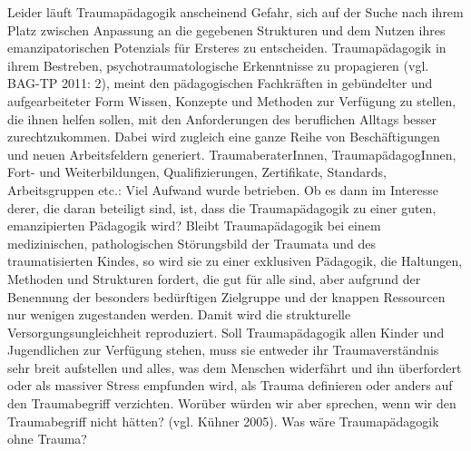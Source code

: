 Leider läuft Traumap{\"a}dagogik anscheinend Gefahr, sich auf der Suche nach ihrem Platz zwischen Anpassung an die gegebenen Strukturen und dem Nutzen ihres emanzipatorischen Potenzials für Ersteres zu entscheiden. Traumapädagogik in ihrem Bestreben, psychotraumatologische Erkenntnisse zu propagieren (vgl. BAG-TP 2011: 2), meint den pädagogischen Fachkräften in gebündelter und aufgearbeiteter Form Wissen, Konzepte und Methoden zur Verfügung zu stellen, die ihnen helfen sollen, mit den Anforderungen des beruflichen Alltags besser zurechtzukommen. Dabei wird zugleich eine ganze Reihe von Beschäftigungen und neuen Arbeitsfeldern generiert. TraumaberaterInnen, TraumapädagogInnen, Fort- und Weiterbildungen, Qualifizierungen, Zertifikate, Standards, Arbeitsgruppen etc.: Viel Aufwand wurde betrieben. Ob es dann im Interesse derer, die daran beteiligt sind, ist, dass die Traumap{\"a}dagogik zu einer guten, emanzipierten Pädagogik wird? Bleibt Traumapädagogik bei einem medizinischen, pathologischen Störungsbild der Traumata und des traumatisierten Kindes, so wird sie zu einer exklusiven Pädagogik, die Haltungen, Methoden und Strukturen fordert, die gut für alle sind, aber aufgrund der Benennung der besonders bedürftigen Zielgruppe und der knappen Ressourcen nur wenigen zugestanden werden. Damit wird die strukturelle Versorgungsungleichheit reproduziert. Soll Traumapädagogik allen Kinder und Jugendlichen zur Verfügung stehen, muss sie entweder ihr Traumaverständnis sehr breit aufstellen und alles, was dem Menschen widerfährt und ihn überfordert oder als massiver Stress empfunden wird, als Trauma definieren oder anders auf den Traumabegriff verzichten. Worüber würden wir aber sprechen, wenn wir den Traumabegriff nicht hätten? (vgl. K{\"u}hner 2005). Was wäre Traumap{\"a}dagogik ohne Trauma?
